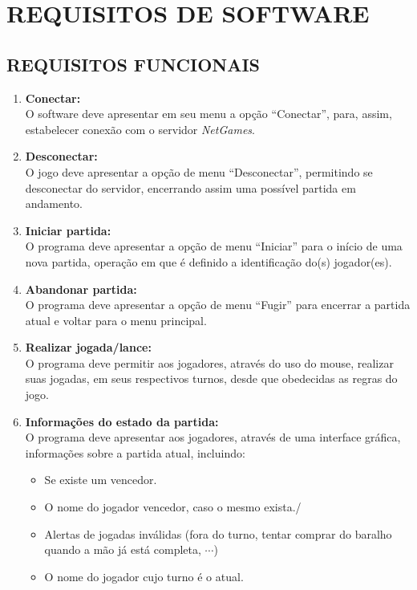 \documentclass[12pt,a4paper,brazil,abntex2]{article}
\begin{document}
\section{\normalsize REQUISITOS DE SOFTWARE}
	\subsection{\normalsize REQUISITOS FUNCIONAIS}
		
		\begin{enumerate}
			\item {\bf Conectar:}\\
				O software deve apresentar em seu menu a opção ``Conectar'', para, assim, estabelecer conexão com o servidor \textit{NetGames}.

			\item {\bf Desconectar:}\\
				O jogo deve apresentar a opção de menu ``Desconectar'', permitindo se desconectar do servidor, encerrando assim uma possível partida em andamento.
			
			\item {\bf Iniciar partida:}\\
				O programa deve apresentar a opção de menu ``Iniciar'' para o início de uma nova partida, operação em que é definido a identificação do(s) jogador(es).
			
			\item {\bf Abandonar partida:}\\
				O programa deve apresentar a opção de menu ``Fugir'' para encerrar a partida atual e voltar para o menu principal.

			\item {\bf Realizar jogada/lance:}\\
				O programa deve permitir aos jogadores, através do uso do mouse, realizar suas jogadas, em seus respectivos turnos, desde que obedecidas as regras do jogo.
			
			\item {\bf Informações do estado da partida:}\\
				O programa deve apresentar aos jogadores, através de uma interface gráfica, informações sobre a partida atual, incluindo:
					\begin{itemize}
						\item Se existe um vencedor.
						\item O nome do jogador vencedor, caso o mesmo exista./
						\item Alertas de jogadas inválidas (fora do turno, tentar comprar do baralho quando a mão já está completa, $\cdots$)
						\item O nome do jogador cujo turno é o atual.
					\end{itemize}
			
		\end{enumerate}
		
\end{document}
